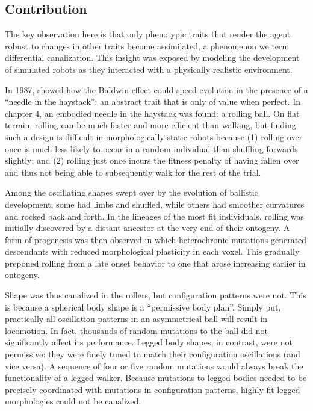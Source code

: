 \subsection{Contribution}


The key observation here is that only phenotypic traits that render the agent robust to changes in other traits become assimilated, a phenomenon we term differential canalization. 
This insight was exposed by modeling the development of simulated robots as they interacted with a physically realistic environment.

In 1987,
\citet{hinton1987learning} showed how the Baldwin effect could speed evolution in the presence of a ``needle in the haystack'': an abstract trait that is only of value when perfect.
In chapter 4,
an embodied needle in the haystack was found: a rolling ball.
On flat terrain, rolling can be much faster and more efficient than walking, but finding such a design is difficult in morphologically-static robots because (1) rolling over once is much less likely to occur in a random individual than shuffling forwards slightly; 
and (2) 
rolling just once incurs the fitness penalty of having fallen over and thus not being able to subsequently walk for the rest of the trial. 
 
Among the oscillating shapes swept over by the evolution of ballistic development, some had limbs and shuffled, while others had smoother curvatures and rocked back and forth.
In the lineages of the most fit individuals,
rolling was initially discovered by a distant ancestor at the very end of their ontogeny.
A form of progenesis was then observed in which heterochronic mutations generated descendants with reduced morphological plasticity in each voxel.
This gradually preponed rolling from a late onset behavior to one that arose increasing earlier in ontogeny.

Shape was thus canalized in the rollers, but configuration patterns were not.
This is because a spherical body shape is a ``permissive body plan''.
Simply put, practically all oscillation patterns in an asymmetrical ball will result in locomotion.
In fact, thousands of random mutations to the ball did not significantly affect its performance.
Legged body shapes, in contrast, were not permissive: they were finely tuned to match their configuration oscillations (and vice versa). 
A sequence of four or five random mutations would always break the functionality of a legged walker.
Because mutations to legged bodies needed to be precisely coordinated with mutations in configuration patterns,
highly fit legged morphologies could not be canalized.

